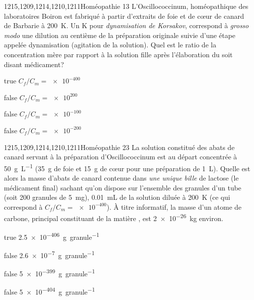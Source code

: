 \documentclass[11pt]{article}
\begin{document}
			\begin{question}{1215,1209,1214,1210,1211}{Homéopathie 1}{3}{}
				L'Oscillococcinum,  homéopathique des laboratoires Boiron est fabriqué à partir d'extraits de foie et de c\oe{}ur de canard de Barbarie à \SI{200}{K}. Un \si{K} pour \textit{dynamisation de Korsakov}, correspond à \textit{grosso modo} une dilution au centième de la préparation originale suivie d'une étape appelée dynamisation (agitation de la solution). Quel est le ratio de la concentration mère par rapport à la solution fille après l'élaboration du soit disant médicament?
			\end{question}
			\begin{reponses} 
				\item[true] $C_f/C_m = \num{e-400}$
				\item[false] $C_f/C_m = \num{e200}$
				\item[false] $C_f/C_m = \num{e-100}$
				\item[false] $C_f/C_m = \num{e-200}$
			\end{reponses}
			
			\begin{question}{1215,1209,1214,1210,1211}{Homéopathie 2}{3}{}
				La solution constitué des abats de canard servant à la préparation d'Oscillococcinum est au départ concentrée à \SI{50}{\gram\per\liter} (\SI{35}{\gram} de foie et \SI{15}{\gram} de c\oe{}ur pour une préparation de \SI{1}{\liter}). Quelle est alors la masse d'abats de canard contenue dans \emph{une unique bille} de lactose (le médicament final) sachant qu'on dispose sur l'ensemble des granules d'un tube (soit 200 granules de \SI{5}{\milli\gram}), \SI{0.01}{\milli\liter} de la solution diluée à \SI{200}{K} (ce qui correspond à $C_f/C_m = \num{e-400}$). À titre informatif, la masse d'un atome de carbone, principal constituant de la matière , est \SI{2e-26}{\kilo\gram} environ.
			\end{question}
			\begin{reponses} 
				\item[true] \SI{2.5e-406}{\gram\per granule}
				\item[false] \SI{2.6e-7}{\gram\per granule}
				\item[false] \SI{5e-399}{\gram\per granule}
				\item[false] \SI{5e-404}{\gram\per granule}
			\end{reponses}
			
\end{document}
